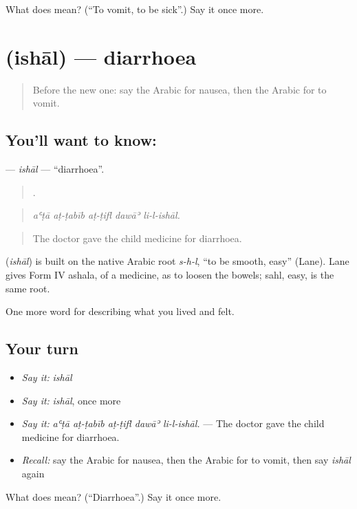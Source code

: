 \begin{tcolorbox}[breakable,colback=teal!4,colframe=teal!35!black,title={Before you move on}]
What does  mean? (\textquotedblleft{}To vomit, to be sick\textquotedblright{}.) Say it once more.
\end{tcolorbox}
\section[\texorpdfstring{\ar{إسهال} (ishāl)}{إسهال (ishāl)}]{ (ishāl) — diarrhoea}

\label{lesson:AR-C507-ishal}



\begin{quote}
Before the new one: say the Arabic for nausea, then the Arabic for to vomit.
\end{quote}

\subsection*{You'll want to know: }
\textbf{} — \emph{ishāl} — \textquotedblleft{}diarrhoea\textquotedblright{}.

\begin{quote}
    .
\end{quote}

\begin{quote}
\emph{aʿṭā aṭ-ṭabīb aṭ-ṭifl dawāʾ li-l-ishāl.}
\end{quote}

\begin{quote}
The doctor gave the child medicine for diarrhoea.
\end{quote}

\begin{cousinweb}
\textbf{} (\emph{ishāl}) is built on the native Arabic root \emph{s-h-l}, \textquotedblleft{}to be smooth, easy\textquotedblright{} (Lane). Lane gives Form IV ashala, of a medicine, as to loosen the bowels; sahl, easy, is the same root.
\end{cousinweb}

\begin{grammarlens}[title={What you've built}]
One more word for describing what you lived and felt.
\end{grammarlens}

\subsection*{Your turn}
\begin{itemize}
\raggedright
  \item \emph{Say it:} \emph{ishāl}
  \item \emph{Say it:} \emph{ishāl}, once more
  \item \emph{Say it:} \emph{aʿṭā aṭ-ṭabīb aṭ-ṭifl dawāʾ li-l-ishāl.} — The doctor gave the child medicine for diarrhoea.
  \item \emph{Recall:} say the Arabic for nausea, then the Arabic for to vomit, then say \emph{ishāl} again
\end{itemize}

\begin{tcolorbox}[breakable,colback=teal!4,colframe=teal!35!black,title={Before you move on}]
What does  mean? (\textquotedblleft{}Diarrhoea\textquotedblright{}.) Say it once more.
\end{tcolorbox}
